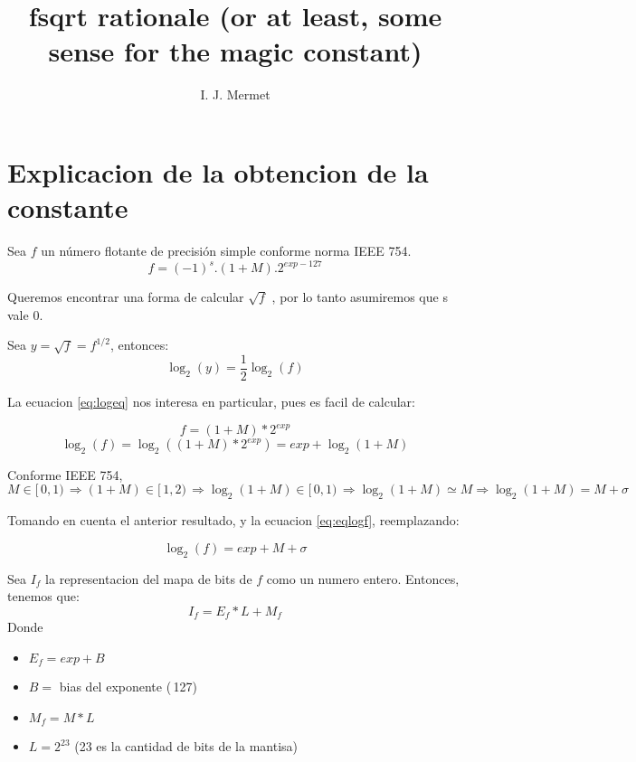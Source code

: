 \documentclass[]{article}
\title{fsqrt rationale (or at least, some sense for the magic constant)}
\author{I. J. Mermet}
\begin{document}
	
	\maketitle
	
	\section{Explicacion de la obtencion de la constante}
Sea \(f\) un número flotante de precisión simple conforme norma IEEE 754.
\begin{equation}
f = (-1)^{s}.(1+M).2^{exp-127}
\end{equation}

Queremos encontrar una forma de calcular \(\sqrt{f}\) , por lo tanto asumiremos que s vale 0.

Sea \(y=\sqrt{f}=f^{1/2}\), entonces:
\begin{equation} \label{eq:logeq}
\log_2(y)=\frac{1}{2}\log_2(f)
\end{equation}

La ecuacion \eqref{eq:logeq} nos interesa en particular, pues es facil de calcular:

\begin{equation}
f = (1 + M)*2^{exp}
\end{equation}
\begin{equation} \label{eq:eqlogf}
	\log_2(f) = \log_2((1 + M)*2^{exp}) = exp + \log_2(1+M)
\end{equation}

Conforme IEEE 754, \(M \in [\,0,1)\,\Rightarrow (1+M)\in[\,1,2)\,\Rightarrow\log_2(1+M)\in[\,0,1)\,\Rightarrow\log_2(1+M)\simeq M\Rightarrow\log_2(1+M)=M+\sigma \)

Tomando en cuenta el anterior resultado, y la ecuacion \eqref{eq:eqlogf}, reemplazando:

\begin{equation}
\log_2(f)=exp+M+\sigma
\end{equation}


Sea \(I_f\) la representacion del mapa de bits de \(f\) como un numero entero. Entonces, tenemos que:
\begin{equation}
I_f = E_f * L + M_f
\end{equation}
Donde \begin{itemize}
	\item \(E_f = exp + B\)
	\item \(B =\) bias del exponente (\,127)\,
	\item \(M_f = M * L\)
	\item \(L = 2^{23}\) (23 es la cantidad de bits de la mantisa)
\end{itemize}
\end{document}
